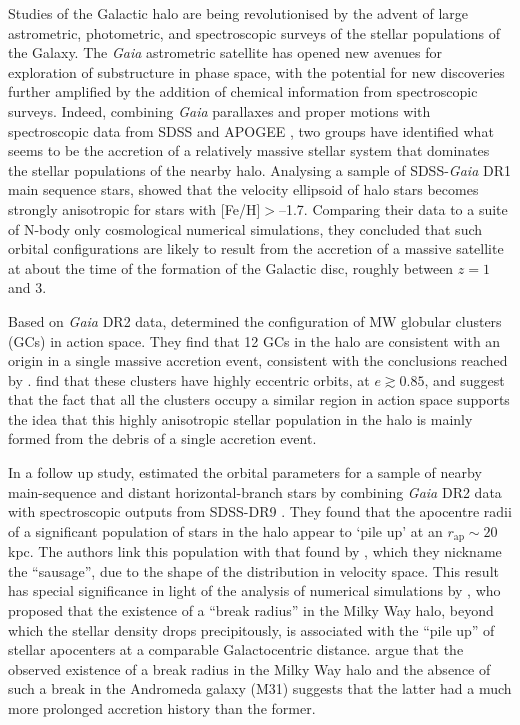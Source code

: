 Studies of the Galactic halo are being revolutionised by the advent of large astrometric,
photometric, and spectroscopic surveys of the stellar populations
of the Galaxy.  The \emph{Gaia} astrometric satellite has opened
new avenues for exploration of substructure in phase space, with
the potential for new discoveries further amplified by the addition
of chemical information from spectroscopic surveys.  Indeed, combining
\emph{Gaia} parallaxes and proper motions
\citep{2016arXiv160904303L,2018arXiv180409365G} with spectroscopic
data from SDSS \citep{2000AJ....120.1579Y} and APOGEE
\citep{2015arXiv150905420M}, two groups have identified what seems
to be the accretion of a relatively massive stellar system that
dominates the stellar populations of the nearby halo.  Analysing a
sample of SDSS-\emph{Gaia} DR1 main sequence stars,
\citet{2018MNRAS.478..611B} showed that the velocity ellipsoid of
halo stars becomes strongly anisotropic for stars with [Fe/H]$>$--1.7.
Comparing their data to a suite of N-body only cosmological numerical
simulations, they concluded that such orbital configurations are
likely to result from the accretion of a massive satellite at about
the time of the formation of the Galactic disc, roughly between
$z=1$ and 3.

Based on \emph{Gaia} DR2 data, \citet{2018arXiv180500453M} determined the configuration
of MW globular clusters (GCs) in action space.  They find that 12 GCs in the halo
are consistent with an origin in a single massive accretion event, consistent with the conclusions reached by
\citet{2018MNRAS.478..611B}.  \citet{2018arXiv180500453M} find that these clusters have
highly eccentric orbits, at $e \gtrsim 0.85$, and suggest that the fact that all the
clusters occupy a similar region in action space supports the idea
that this highly anisotropic stellar population in the halo is mainly
formed from the debris of a single accretion event.

In a follow up study, \citet{2018arXiv180510288D} estimated the
orbital parameters for a sample of nearby main-sequence and distant
horizontal-branch stars by combining \emph{Gaia} DR2 data
\citep{2018arXiv180409365G} with spectroscopic outputs from SDSS-DR9
\citep{2012ApJS..203...21A}.  They found that the apocentre radii
of a significant population of stars in the halo appear to `pile
up' at an $r_\mathrm{ap} \sim 20$ kpc. The authors link this
population with that found by \citet{2018MNRAS.478..611B}, which
they nickname the ``sausage'', due to the shape of the distribution
in velocity space.  This result has special significance in light
of the analysis of numerical simulations by \citet{2013ApJ...763..113D},
who proposed that the existence of a ``break radius'' in the Milky
Way halo, beyond which the stellar density drops precipitously, is
associated with the ``pile up'' of stellar apocenters at a comparable
Galactocentric distance.  \citet{2013ApJ...763..113D} argue that
the observed existence of a break radius in the Milky Way halo and
the absence of such a break in the Andromeda galaxy (M31) suggests
that the latter had a much more prolonged accretion history than
the former.

